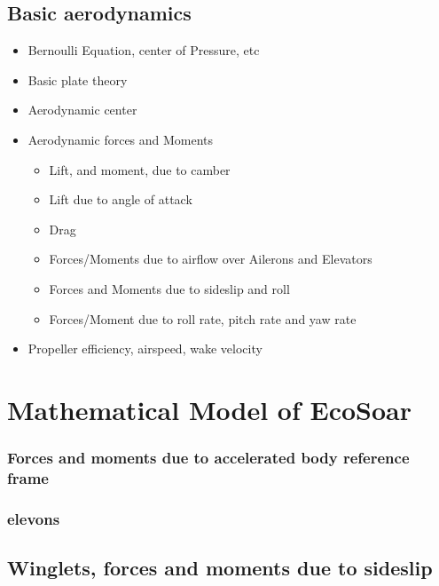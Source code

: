 \documentclass{article}
\begin{document}
\subsection {Basic aerodynamics}

\begin{itemize}
        \item Bernoulli Equation, center of Pressure, etc
        \item Basic plate theory
        \item Aerodynamic center    
        \item Aerodynamic forces and Moments
        \begin{itemize}
            \item Lift, and moment, due to camber
            \item Lift due to angle of attack
            \item Drag
            \item Forces/Moments due to airflow over Ailerons and Elevators
            \item Forces and Moments due to sideslip and roll
            \item Forces/Moment due to roll rate, pitch rate and yaw rate
        \end{itemize}
        \item Propeller efficiency, airspeed, wake velocity
    \end{itemize}

\section{Mathematical Model of EcoSoar}








\subsubsection{Forces and moments due to accelerated body reference frame}



\subsubsection{elevons}


\subsection{Winglets, forces and moments due to sideslip}

\end{document}
